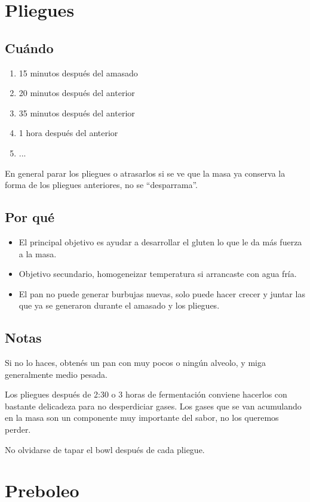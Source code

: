 \documentclass[10pt,a4paper]{article}
\begin{document}
\section{Pliegues}
\subsection*{Cuándo}
  \begin{enumerate}
    \item 15 minutos después del amasado
    \item 20 minutos después del anterior
    \item 35 minutos después del anterior
    \item 1 hora después del anterior
    \item ...
  \end{enumerate}

En general parar los pliegues o atrasarlos  si se ve que la masa
ya conserva la forma de los pliegues anteriores, no se ``desparrama''.

\subsection*{Por qué}
\begin{itemize}
  \item El principal objetivo es ayudar a desarrollar el gluten lo que le da más
    fuerza a la masa.
    \item Objetivo secundario, homogeneizar temperatura si arrancaste con agua fría.
    \item El pan no puede generar burbujas nuevas, solo puede hacer crecer y
      juntar las que ya se generaron durante el amasado y los pliegues.
\end{itemize}

\subsection*{Notas}
Si no lo haces, obtenés un pan con muy pocos o ningún alveolo, y miga
generalmente medio pesada.

Los pliegues después de 2:30 o 3 horas de fermentación conviene hacerlos con
bastante delicadeza para no desperdiciar gases. Los gases que se van acumulando
en la masa son un componente muy importante del sabor, no los queremos perder.

No olvidarse de tapar el bowl después de cada pliegue.

\section{Preboleo}
\end{document}
